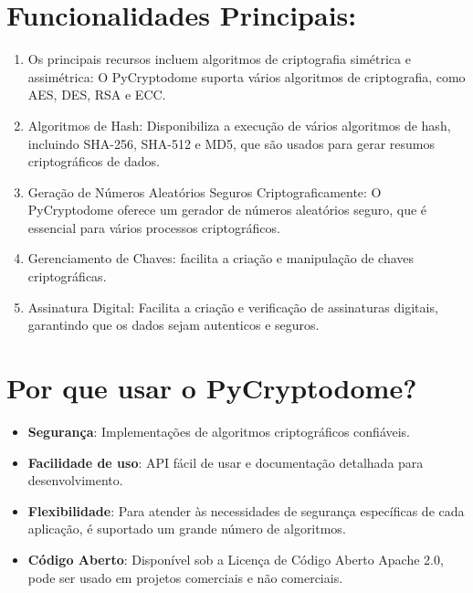 \documentclass[a4paper,12pt]{article}
\begin{document}
\section{Funcionalidades Principais:}
\begin{enumerate}
\item Os principais recursos incluem algoritmos de criptografia simétrica e assimétrica: 
O PyCryptodome suporta vários algoritmos de criptografia, como AES, DES, RSA e ECC.

\item Algoritmos de Hash: Disponibiliza a execução de vários algoritmos de hash, incluindo 
SHA-256, SHA-512 e MD5, que são usados para gerar resumos criptográficos de dados.

\item Geração de Números Aleatórios Seguros Criptograficamente: O PyCryptodome oferece 
um gerador de números aleatórios seguro, que é essencial para vários processos criptográficos.

\item Gerenciamento de Chaves: facilita a criação e manipulação de chaves criptográficas.

\item Assinatura Digital: Facilita a criação e verificação de assinaturas digitais, 
garantindo que os dados sejam autenticos e seguros.

\end{enumerate}

\section{Por que usar o PyCryptodome?}

\begin{itemize}
\item \textbf{Segurança}: Implementações de algoritmos criptográficos confiáveis.

\item \textbf{Facilidade de uso}: API fácil de usar e documentação detalhada para desenvolvimento.

\item \textbf{Flexibilidade}: Para atender às necessidades de segurança específicas de cada aplicação, 
é suportado um grande número de algoritmos.

\item \textbf{Código Aberto}: Disponível sob a Licença de Código Aberto Apache 2.0, pode ser 
usado em projetos comerciais e não comerciais.

\end{itemize}
\end{document}
